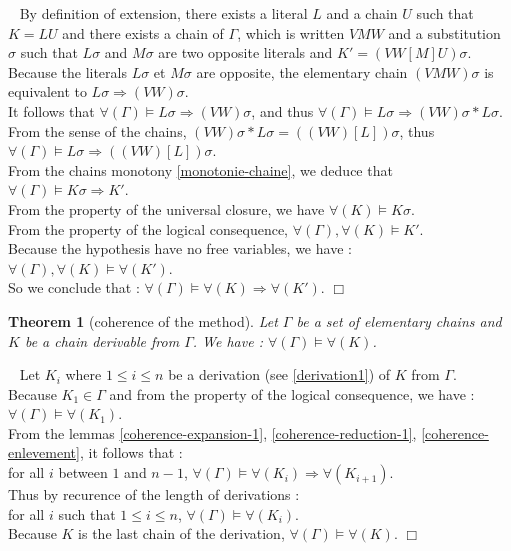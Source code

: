 \documentclass{article}
\newtheorem{theoreme}{Theorem}\newtheorem{lemme}[theoreme]{Lemma}
\newenvironment{preuve}{\noindent {\em Proof :}\ }{{\hfill
    $\Box$}\vspace{.5pc}} \newcommand{\sg}{\!\!<\!\!}
\begin{document}
\begin{preuve}
By definition of extension, there exists a literal $L$ and a chain $U$ such that $K= LU$ and there exists a chain of $\Gamma$, 
which is written $VMW$ and a substitution $\sigma$ such that $L\sigma$ and $M\sigma$ are two opposite literals and
 $K' = (VW[M]U)\sigma$.\\
Because the literals  $L\sigma$ et $M\sigma$ are opposite, the elementary chain $(VMW)\sigma$ is equivalent to
 $L\sigma \Rightarrow (VW)\sigma$.\\
It follows that $\forall(\Gamma) \models L\sigma \Rightarrow (VW)\sigma$, and thus
$\forall(\Gamma) \models  L\sigma \Rightarrow (VW)\sigma * L\sigma$.\\
From the sense of the chains, $(VW)\sigma * L\sigma=((VW)[L])\sigma$, thus 
$\forall(\Gamma) \models L\sigma \Rightarrow ((VW)[L])\sigma$.\\ 
From the chains monotony \ref{monotonie-chaine}, we deduce that $\forall(\Gamma) \models K\sigma \Rightarrow K'$.\\
From the property of the universal closure, we have $\forall(K) \models K\sigma$.\\
From the property of the logical consequence, $\forall(\Gamma),\forall(K) \models K'$.\\
Because the hypothesis have no free variables, we have : $\forall(\Gamma),\forall(K) \models \forall(K')$.\\
So we conclude that :  $\forall(\Gamma) \models \forall(K) \Rightarrow \forall(K')$.
\end{preuve}


\begin{theoreme}[coherence of the method]
Let $\Gamma$ be a set of elementary chains and $K$ be a chain derivable from $\Gamma$.
We have : $\forall(\Gamma) \models \forall(K)$.
\end{theoreme}

\begin{preuve}
Let $K_i$ where $1 \leq i \leq n$ be a derivation (see \ref{derivation1}) of $K$ from $\Gamma$.\\
Because $K_1 \in \Gamma$ and from the property of the logical consequence, we have :\\ $\forall(\Gamma) \models \forall(K_1)$.\\
From the lemmas \ref{coherence-expansion-1}, \ref{coherence-reduction-1}, \ref{coherence-enlevement}, it follows that :\\
for all $i$ between $1$ and $n-1$, $\forall(\Gamma) \models \forall(K_i) \Rightarrow \forall(K_{i+1})$.\\
Thus by recurence of the length of derivations :\\
for all $i$ such that $1 \leq i \leq n$, $\forall(\Gamma) \models \forall(K_i)$.\\
Because $K$ is the last chain of the derivation, $\forall(\Gamma) \models \forall(K)$.
\end{preuve}
\end{document}
